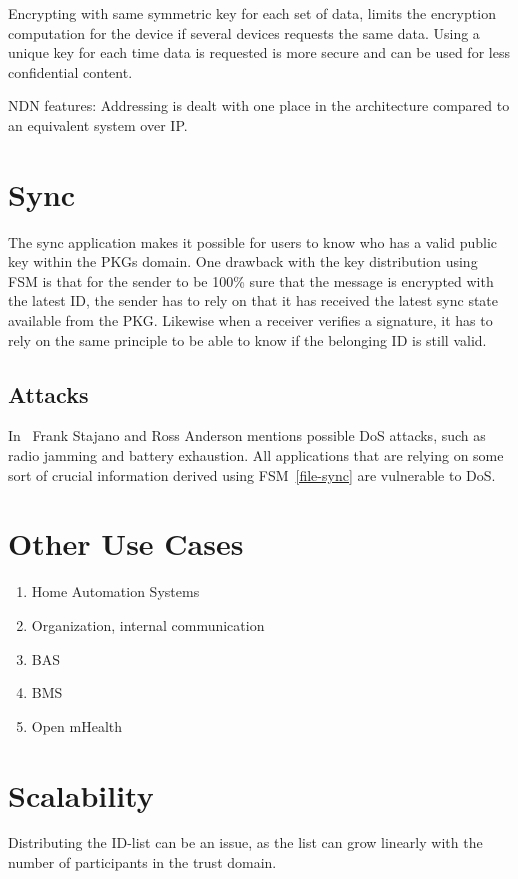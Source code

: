 Encrypting with same symmetric key for each set of data, limits the encryption computation for the device if several devices requests the same data.
Using a unique key for each time data is requested is more secure and can be used for less confidential content.

\gls{NDN} features: Addressing is dealt with one place in the architecture compared to an equivalent system over \gls{IP}. 


\section{Sync}
The sync application makes it possible for users to know who has a valid public key within the \gls{PKG}s domain.
One drawback with the key distribution using \gls{FSM} is that for the sender to be 100\% sure that the message is encrypted with the latest \gls{ID}, the sender has to rely on that it has received the latest sync state available from the \gls{PKG}.
Likewise when a receiver verifies a signature, it has to rely on the same principle to be able to know if the belonging \gls{ID} is still valid.

\subsection{Attacks}
In~\cite{DBLP:conf/spw/StajanoA99} Frank Stajano and Ross Anderson mentions possible \gls{DoS} attacks, such as radio jamming and battery exhaustion. 
All applications that are relying on some sort of crucial information derived using \gls{FSM}~\autoref{file-sync} are vulnerable to \gls{DoS}.

\section{Other Use Cases}

\begin{enumerate}
	\item Home Automation Systems
	\item Organization, internal communication
	\item \gls{BAS}
	\item \gls{BMS}
	\item Open mHealth
\end{enumerate}

\section{Scalability}
Distributing the \gls{ID}-list can be an issue, as the list can grow linearly with the number of participants in the trust domain.